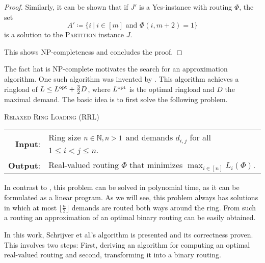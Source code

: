 \begin{proof}
	Similarly, it can be shown that if $J'$ is a Yes-instance with routing $\Phi$, the set 
	\begin{equation}
		A' \coloneqq \{i \ |\ i \in [m] \text{ and } \Phi(i, m+2) = 1\}
	\end{equation} 
	is a solution to the \textsc{Partition} instance $J$.
	
	This shows NP-completeness and concludes the proof.
\end{proof}



The fact hat \RL is NP-complete motivates the search for an approximation algorithm.
One such algorithm was invented by \citet{schrijver99}.
This algorithm achieves a ringload of $L \leq L^{\mathrm{opt}} + \frac{3}{2}D$, where $L^{\mathrm{opt}}$ is the optimal ringload and $D$ the maximal demand.
The basic idea is to first solve the following problem.
\begin{center}
	\begin{mdframed}
		\centering
		\textsc{Relaxed Ring Loading} (\textsc{RRL})\\[0.7em]
		\begin{tabular}{rl}
			{\bfseries Input}: & Ring size $n \in \mathbb{N}, n > 1$ and demands $d_{i, j}$ for all $1 \leq i<j\leq n$.\\
			{\bfseries Output}: & Real-valued routing $\Phi$ that minimizes $\max_{i \in [n]} L_i(\Phi)$.
		\end{tabular}
	\end{mdframed}
\end{center}
In contrast to \RL, this problem can be solved in polynomial time, as it can be formulated as a linear program.
As we will see, this problem always has solutions in which at most $\lfloor \frac{n}{2} \rfloor$ demands are routed both ways around the ring.
From such a routing an approximation of an optimal binary routing can be easily obtained.

In this work, Schrijver et al.'s algorithm is presented and its correctness proven.
This involves two steps: First, deriving an algorithm for computing an optimal real-valued routing and second, transforming it into a binary routing.

